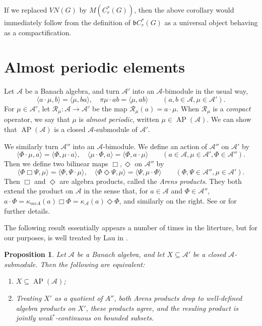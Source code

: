 \documentclass[twoside,a4paper]{article}
\newtheorem{proposition}[theorem]{Proposition}
\theoremstyle{definition}
\theoremstyle{remark}
\newcommand{\ap}{{\operatorname{AP}}}
\newcommand{\mc}{\mathcal}
\newcommand{\mf}{\mathfrak}
\newcommand{\ip}[2]{\langle{#1},{#2}\rangle}
\newcommand{\aone}{\Box}
\newcommand{\atwo}{\Diamond}
\begin{document}
If we replaced $VN(G)$ by $M(C^*_r(G))$, then the above corollary would immediately
follow from the definition of $\mf b C^*_r(G)$ as a universal object behaving
as a compactification.





\section{Almost periodic elements}

Let $\mc A$ be a Banach algebra, and turn $\mc A'$ into an $\mc A$-bimodule in the usual way,
\[ \ip{a\cdot\mu}{b} = \ip{\mu}{ba}, \quad
\pi{\mu\cdot a}{b} = \ip{\mu}{ab} \qquad (a,b\in\mc A,\mu\in\mc A'). \]
For $\mu\in\mc A'$, let $\mc R_\mu:\mc A\rightarrow\mc A'$ be the map $\mc R_\mu(a) = a\cdot\mu$.
When $\mc R_\mu$ is a \emph{compact} operator, we say that $\mu$ is \emph{almost periodic},
written $\mu\in\ap(\mc A)$.  We can show that $\ap(\mc A)$ is a closed $\mc A$-submodule of
$\mc A'$.

We similarly turn $\mc A''$ into an $\mc A$-bimodule.  We define an action of $\mc A''$ on
$\mc A'$ by
\[ \ip{\Phi\cdot\mu}{a} = \ip{\Phi}{\mu\cdot a}, \quad
\ip{\mu\cdot\Phi}{a} = \ip{\Phi}{a\cdot\mu} \qquad (a\in\mc A, \mu\in\mc A', \Phi\in\mc A''). \]
Then we define two bilinear maps $\aone,\atwo$ on $\mc A''$ by
\[ \ip{\Phi\aone\Psi}{\mu} = \ip{\Phi}{\Psi\cdot\mu}, \quad
\ip{\Phi\atwo\Psi}{\mu} = \ip{\Psi}{\mu\cdot\Phi} \qquad (\Phi,\Psi\in\mc A'', \mu\in\mc A'). \]
Then $\aone$ and $\atwo$ are algebra products, called the \emph{Arens products}.  They
both extend the product on $\mc A$ in the sense that, for $a\in\mc A$ and $\Phi\in\mc A''$,
 $a\cdot\Phi = \kappa_{mc A}(a)\aone\Phi = \kappa_{\mc A}(a)\atwo\Phi$, and similarly on the
right.  See \cite[???]{Dales} or \cite[???]{palmer1} for further details.

The following result essentially appears a number of times in the literture, but for our
purposes, is well treated by Lau in \cite[Theorem~5.8]{lau}.

\begin{proposition}\label{ap_for_banalg}
Let $\mc A$ be a Banach algebra, and let $X\subseteq\mc A'$ be a closed $\mc A$-submodule.
Then the following are equivalent:
\begin{enumerate}
\item $X\subseteq\ap(\mc A)$;
\item Treating $X'$ as a quotient of $A''$, both Arens products drop to well-defined
algebra products on $X'$, these products agree, and the resuling product is jointly
weak$^*$-continuous on bounded subsets.
\end{enumerate}
\end{proposition}
\end{document}
